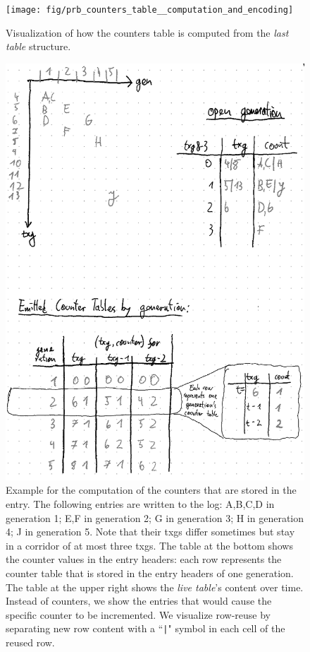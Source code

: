 \documentclass[12pt,a4paper,twoside]{book}
\begin{document}
\begin{figure}[H]
    \centering
    \texttt{[image: fig/prb\_counters\_table\_\_computation\_and\_encoding]}
    \caption{
        Visualization of how the counters table is computed from the \textit{last table} structure.
    }
    \label{fig:prb_counters_table__computation_and_encoding}
\end{figure}

\begin{figure}[H]
    \centering
    \includegraphics{fig/prb_counters_table__example}
    \caption{
        Example for the computation of the counters that are stored in the entry.
        The following entries are written to the log:
        A,B,C,D in generation 1; E,F in generation 2; G in generation 3; H in generation 4; J in generation 5.
        Note that their txgs differ sometimes but stay in a corridor of at most three txgs.
        The table at the bottom shows the counter values in the entry headers:
        each row represents the counter table that is stored in the entry headers of one generation.
        The table at the upper right shows the \textit{live table}'s content over time.
        Instead of counters, we show the entries that would cause the specific counter to be incremented.
        We visualize row-reuse by separating new row content with a ``\lstinline{|}" symbol in each cell of the reused row.
    }
    \label{fig:prb_counters_table__example}
\end{figure}
\end{document}
